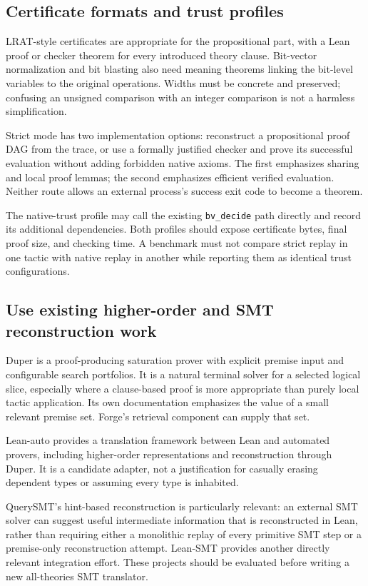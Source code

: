 \documentclass[11pt,a4paper]{article}
\begin{document}
\subsection{Certificate formats and trust profiles}

LRAT-style certificates are appropriate for the propositional part, with a Lean proof or checker theorem for every introduced theory clause. Bit-vector normalization and bit blasting also need meaning theorems linking the bit-level variables to the original operations. Widths must be concrete and preserved; confusing an unsigned comparison with an integer comparison is not a harmless simplification.

Strict mode has two implementation options: reconstruct a propositional proof DAG from the trace, or use a formally justified checker and prove its successful evaluation without adding forbidden native axioms. The first emphasizes sharing and local proof lemmas; the second emphasizes efficient verified evaluation. Neither route allows an external process's success exit code to become a theorem.

The native-trust profile may call the existing \texttt{bv\_decide} path directly and record its additional dependencies. Both profiles should expose certificate bytes, final proof size, and checking time. A benchmark must not compare strict replay in one tactic with native replay in another while reporting them as identical trust configurations.

\subsection{Use existing higher-order and SMT reconstruction work}

Duper is a proof-producing saturation prover with explicit premise input and configurable search portfolios. It is a natural terminal solver for a selected logical slice, especially where a clause-based proof is more appropriate than purely local tactic application. Its own documentation emphasizes the value of a small relevant premise set. Forge's retrieval component can supply that set.\cite{duper}

Lean-auto provides a translation framework between Lean and automated provers, including higher-order representations and reconstruction through Duper. It is a candidate adapter, not a justification for casually erasing dependent types or assuming every type is inhabited.\cite{lean-auto}

QuerySMT's hint-based reconstruction is particularly relevant: an external SMT solver can suggest useful intermediate information that is reconstructed in Lean, rather than requiring either a monolithic replay of every primitive SMT step or a premise-only reconstruction attempt. Lean-SMT provides another directly relevant integration effort. These projects should be evaluated before writing a new all-theories SMT translator.\cite{querysmt,lean-smt}
\end{document}
